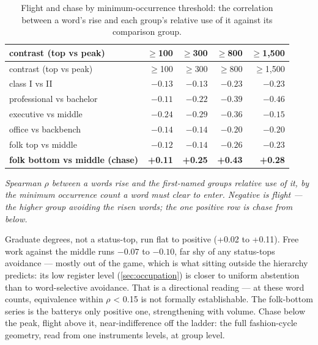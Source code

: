 \begingroup\small
\begin{longtable}[]{@{}lrrrr@{}}
\caption{Flight and chase by minimum-occurrence threshold: the correlation between a word's rise and each group's relative use of it against its comparison group.}\label{tab:flight-thresholds}\\
\toprule\noalign{}
contrast (top vs peak) & \(\geq\)100 & \(\geq\)300 & \(\geq\)800 & \(\geq\)1,500 \\
\midrule\noalign{}
\endfirsthead
\toprule\noalign{}
contrast (top vs peak) & \(\geq\)100 & \(\geq\)300 & \(\geq\)800 & \(\geq\)1,500 \\
\midrule\noalign{}
\endhead
\bottomrule\noalign{}
\endlastfoot
class I vs II & \(-0.13\) & \(-0.13\) & \(-0.23\) & \(-0.23\) \\
professional vs bachelor & \(-0.11\) & \(-0.22\) & \(-0.39\) & \(-0.46\) \\
executive vs middle & \(-0.24\) & \(-0.29\) & \(-0.36\) & \(-0.15\) \\
office vs backbench & \(-0.14\) & \(-0.14\) & \(-0.20\) & \(-0.20\) \\
folk top vs middle & \(-0.12\) & \(-0.14\) & \(-0.26\) & \(-0.23\) \\
\textbf{folk bottom vs middle (chase)} & \textbf{+0.11} & \textbf{+0.25} & \textbf{+0.43} & \textbf{+0.28} \\
\end{longtable}
\endgroup

\emph{Spearman \(\rho\) between a word\textquotesingle s rise and the first-named group\textquotesingle s relative use of
it, by the minimum occurrence count a word must clear to enter. Negative is
flight --- the higher group avoiding the risen words; the one positive row is
chase from below.}

Graduate degrees, not a status-top, run flat to positive (+0.02 to +0.11).
Free work against the middle runs \(-0.07\) to \(-0.10\), far shy of any
status-top\textquotesingle s avoidance --- mostly out of the game, which is what sitting
outside the hierarchy predicts: its low register level (\cref{sec:occupation}) is closer to
uniform abstention than to word-selective avoidance. That is a directional
reading --- at these word counts, equivalence within \textbar \(\rho\)\textbar{} \textless{} 0.15 is not
formally establishable. The folk-bottom series is the battery\textquotesingle s only
positive one, strengthening with volume. Chase below the peak, flight above
it, near-indifference off the ladder: the full fashion-cycle geometry, read
from one instrument\textquotesingle s levels, at group level.

